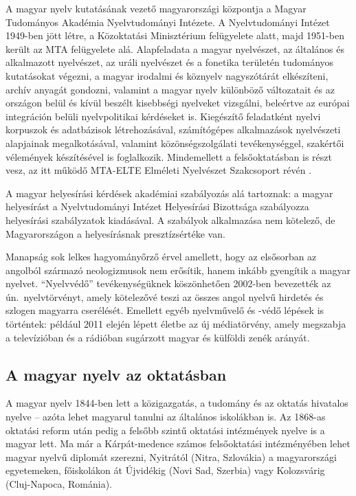 \begin{multicols}{2}
  A magyar nyelv kutatásának vezető ma\-gyar\-or\-szá\-gi központja a Magyar Tu\-do\-má\-nyos Akadémia Nyelvtudományi Intézete. A Nyelvtudományi Intézet 1949-ben jött létre, a Közoktatási Minisztérium felügyelete alatt, majd 1951-ben került az MTA felügyelete alá. Alapfeladata a magyar nyelvészet, az általános és alkalmazott nyelvészet, az uráli nyelvészet és a fonetika területén tudományos kutatásokat végezni, a magyar irodalmi és köznyelv nagyszótárát elkészíteni, archív anyagát gondozni, valamint a magyar nyelv különböző változatait és az országon belül és kívül beszélt kisebbségi nyelveket vizsgálni, beleértve az európai integráción belüli nyelvpolitikai kérdéseket is. Kiegészítő feladatként nyelvi korpuszok és adatbázisok létrehozásával, számítógépes alkalmazások nyelvészeti alapjainak meg\-al\-ko\-tá\-sá\-val, valamint közönségszolgálati tevékenységgel, szakértői vélemények ké\-szí\-té\-sé\-vel is foglalkozik. Mindemellett a felsőoktatásban is részt vesz, az itt működő MTA-ELTE Elméleti Nyelvészet Szakcsoport révén \cite{nytud}.

  A magyar helyesírási kérdések akadémiai szabályozás alá tartoznak: a magyar helyesírást a Nyelvtudományi Intézet He\-lyes\-írá\-si Bizottsága szabályozza helyesírási szabályzatok kiadásával. A szabályok alkalmazása nem kötelező, de Magyarországon a helyesírásnak presz\-tízs\-ér\-té\-ke van.

  Manapság sok lelkes hagyományőrző érvel amellett, hogy az elsősorban az angolból származó neologizmusok nem erősítik, hanem inkább gyengítik a magyar nyelvet. "`Nyelvvédő"' tevékenységüknek köszönhetően 2002-ben bevezették az ún.\ nyelv\-tör\-vényt, amely kötelezővé teszi az összes angol nyelvű hirdetés és szlogen magyarra cserélését. Emellett egyéb nyelvművelő és -védő lépések is történtek: például 2011 elején lépett életbe az új mé\-dia\-tör\-vény, amely megszabja a televízióban és a rádióban sugárzott magyar és külföldi zenék arányát.

  \subsection{A magyar nyelv az oktatásban}

  A magyar nyelv 1844-ben lett a közigazgatás, a tudomány és az oktatás hivatalos nyelve -- azóta lehet magyarul tanulni az általános iskolákban is. Az 1868-as oktatási reform után pedig a felsőbb szintű oktatási intézmények nyelve is a magyar lett. Ma már a Kárpát-medence számos felsőoktatási intézményében lehet ma\-gyar nyelvű diplomát szerezni, Nyitrától (Nit\-ra, Szlovákia) a magyarországi egyetemeken, főiskolákon át Újvidékig (Novi Sad, Szerbia) vagy Kolozsvárig (Cluj-Napoca, Románia). 


\end{multicols}
